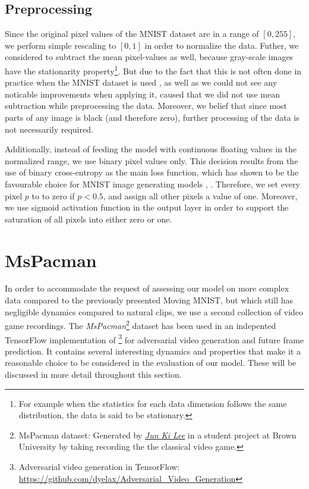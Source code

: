 \subsection{Preprocessing}

Since the original pixel values of the MNIST dataset are in a range of $[0, 255]$, we perform simple rescaling to $[0, 1]$ in order to normalize the data. Futher, we considered to subtract the mean pixel-values as well, because gray-scale images have the stationarity property\footnote{For example when the statistics for each data dimension follows the same distribution, the data is said to be stationary.}. But due to the fact that this is not often done in practice when the MNIST dataset is used \parencite{stanford_data_pre}, as well as we could not see any noticable improvements when applying it, caused that we did not use mean subtraction while preprocessing the data. Moreover, we belief that since most parts of any image is black (and therefore zero), further processing of the data is not necessarily required.

Additionally, instead of feeding the model with continuous floating values in the normalized range, we use binary pixel values only. This decision results from the use of binary cross-entropy as the main loss function, which has shown to be the favourable choice for MNIST image generating models \parencite{unsup_learn_lstm}, \parencite{conv_lstm_nowcasting}. Therefore, we set every pixel $p$ to to zero if $p < 0.5 $, and assign all other pixels a value of one. Moreover, we use sigmoid activation function in the output layer in order to support the saturation of all pixels into either zero or one.

\section{MsPacman}

In order to accommodate the request of assessing our model on more complex data compared to the previously presented Moving MNIST, but which still has negligible dynamics compared to natural clips, we use a second collection of video game recordings. The \textit{MsPacman}\footnote{MsPacman dataset: Generated by \href{mailto:jun_ki_lee@brown.edu}{\textit{Jun Ki Lee}} in a student project at Brown University by taking recording the the classical video game.} dataset has been used in an indepented TensorFlow implementation of \parencite{deep_multiscale_video_pred}\footnote{Adversarial video generation in TensorFlow:\\ \url{https://github.com/dyelax/Adversarial_Video_Generation}} for adversarial video generation and future frame prediction. It contains several interesting dynamics and properties that make it a reasonable choice to be considered in the evaluation of our model. These will be discussed in more detail throughout this section.

